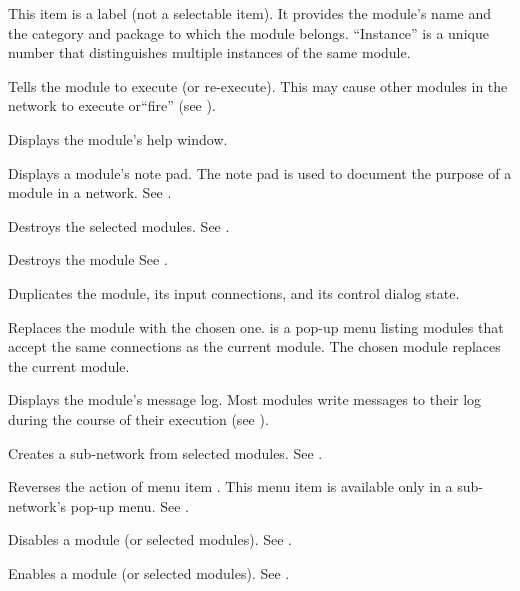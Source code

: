 \begin{description}
  \begin{description}
     This item is a
    label (not a selectable item).  It provides the module's name and
    the category and package to which the module belongs.
    ``Instance'' is a unique number that distinguishes multiple
    instances of the same module.
    
     Tells the module to execute (or
    re-execute).  This may cause other modules in the network to
    execute or``fire'' (see ).

     Displays the module's help window.
    
     Displays a module's note pad.  The note pad
    is used to document the purpose of a module in a network.  See
    .

     Destroys the selected modules.
    See .
    
     Destroys the module See .

     Duplicates the module, its input connections,
    and its control dialog state.
    
     Replaces the module with the chosen
    one.   is a pop-up menu listing modules that
    accept the same connections as the current module.  The chosen
    module replaces the current module.
    
     Displays the module's message log.  Most
    modules write messages to their log during the course of
    their execution (see ).
    
     Creates a sub-network from
    selected modules.  See .
    
     Reverses the action of menu item
    .  This menu item is available only in
    a sub-network's pop-up menu.  See .
    
     Disables a module (or selected modules).
    See .
    
     Enables a module (or selected modules).  See
    .

  \end{description}
\end{description}


